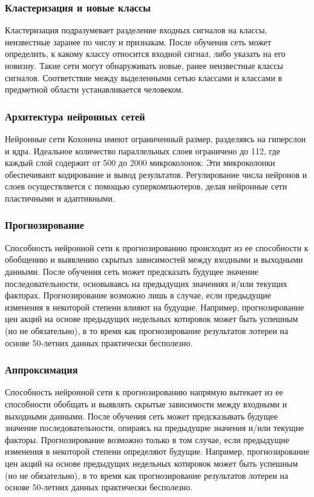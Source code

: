 \subsubsection{Кластеризация и новые классы}
Кластеризация подразумевает разделение входных сигналов на классы, неизвестные заранее по числу и признакам. После обучения сеть может определить, к какому классу относится входной сигнал, либо указать на его новизну. Такие сети могут обнаруживать новые, ранее неизвестные классы сигналов. Соответствие между выделенными сетью классами и классами в предметной области устанавливается человеком.

\subsubsection{Архитектура нейронных сетей}
Нейронные сети Кохонена имеют ограниченный размер, разделяясь на гиперслои и ядра. Идеальное количество параллельных слоев ограничено до 112, где каждый слой содержит от 500 до 2000 микроколонок. Эти микроколонки обеспечивают кодирование и вывод результатов. Регулирование числа нейронов и слоев осуществляется с помощью суперкомпьютеров, делая нейронные сети пластичными и адаптивными.

\subsubsection{Прогнозирование}
Способность нейронной сети к прогнозированию происходит из ее способности к обобщению и выявлению скрытых зависимостей между входными и выходными данными. После обучения сеть может предсказать будущее значение последовательности, основываясь на предыдущих значениях и/или текущих факторах. Прогнозирование возможно лишь в случае, если предыдущие изменения в некоторой степени влияют на будущие. Например, прогнозирование цен акций на основе предыдущих недельных котировок может быть успешным (но не обязательно), в то время как прогнозирование результатов лотереи на основе 50-летних данных практически бесполезно.

\subsubsection{Аппроксимация}
Способность нейронной сети к прогнозированию напрямую вытекает из ее способности обобщать и выявлять скрытые зависимости между входными и выходными данными. После обучения сеть может предсказывать будущее значение последовательности, опираясь на предыдущие значения и/или текущие факторы. Прогнозирование возможно только в том случае, если предыдущие изменения в некоторой степени определяют будущие. Например, прогнозирование цен акций на основе предыдущих недельных котировок может быть успешным (но не обязательно), в то время как прогнозирование результатов лотереи на основе 50-летних данных практически бесполезно.

